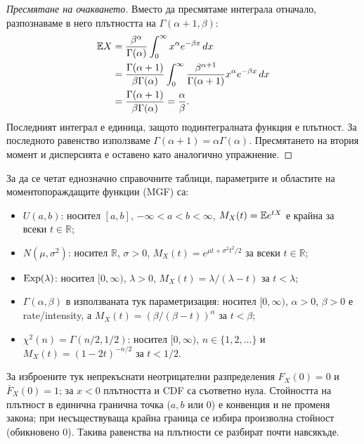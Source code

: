 \begin{proof}[Пресмятане на очакването]
Вместо да пресмятаме интеграла отначало, разпознаваме в него плътността на $\Gamma(\alpha+1,\beta)$:
\begin{align*}
\mathbb{E} X
&=\frac{\beta^\alpha}{\Gamma(\alpha)}
  \int_0^\infty x^\alpha e^{-\beta x}\,dx \\
&=\frac{\Gamma(\alpha+1)}{\beta\Gamma(\alpha)}
  \int_0^\infty
  \frac{\beta^{\alpha+1}}{\Gamma(\alpha+1)}
  x^\alpha e^{-\beta x}\,dx \\
&=\frac{\Gamma(\alpha+1)}{\beta\Gamma(\alpha)}
 =\frac{\alpha}{\beta}.
\end{align*}
Последният интеграл е единица, защото подинтегралната функция е плътност. За последното равенство използваме $\Gamma(\alpha+1)=\alpha\Gamma(\alpha)$. Пресмятането на втория момент и дисперсията е оставено като аналогично упражнение.
\end{proof}

\begin{supp}
За да се четат еднозначно справочните таблици, параметрите и областите на моментопораждащите функции (MGF) са:
\begin{itemize}
    \item $U(a,b)$: носител $[a,b]$, $-\infty<a<b<\infty$, $M_X(t)=\mathbb{E} e^{tX}$ е крайна за всеки $t\in\mathbb{R}$;
    \item $N(\mu,\sigma^2)$: носител $\mathbb{R}$, $\sigma>0$, $M_X(t)=e^{\mu t+\sigma^2t^2/2}$ за всеки $t\in\mathbb{R}$;
    \item $\operatorname{Exp}(\lambda)$: носител $[0,\infty)$, $\lambda>0$, $M_X(t)=\lambda/(\lambda-t)$ за $t<\lambda$;
    \item $\Gamma(\alpha,\beta)$ в използваната тук параметризация: носител $[0,\infty)$, $\alpha>0$, $\beta>0$ е rate/intensity, а $M_X(t)=(\beta/(\beta-t))^\alpha$ за $t<\beta$;
    \item $\chi^2(n)=\Gamma(n/2,1/2)$: носител $[0,\infty)$, $n\in\{1,2,\ldots\}$ и $M_X(t)=(1-2t)^{-n/2}$ за $t<1/2$.
\end{itemize}
За изброените тук непрекъснати неотрицателни разпределения $F_X(0)=0$ и $\bar F_X(0)=1$; за $x<0$ плътността и CDF са съответно нула. Стойността на плътност в единична гранична точка ($a,b$ или $0$) е конвенция и не променя закона; при несъществуваща крайна граница се избира произволна стойност (обикновено $0$). Такива равенства на плътности се разбират почти навсякъде.
\end{supp}

